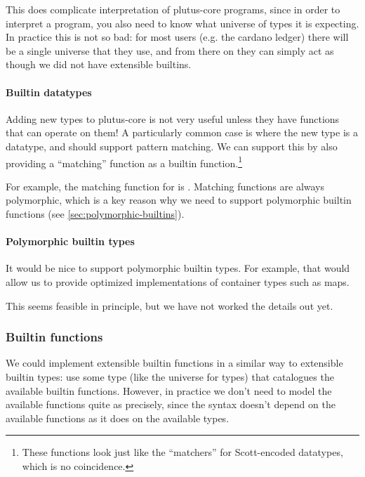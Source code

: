 This does complicate interpretation of \gls{plutus-core} programs, since in order to interpret a program, you also need to know what universe of types it is expecting.
In practice this is not so bad: for most users (e.g. the \gls{cardano} ledger) there will be a single universe that they use, and from there on they can simply act as though we did not have extensible builtins.

\paragraph{Builtin datatypes}

Adding new types to \gls{plutus-core} is not very useful unless they have functions that can operate on them!
A particularly common case is where the new type is a datatype, and should support pattern matching.
We can support this by also providing a ``matching'' function as a builtin function.\footnote{
  These functions look just like the ``matchers'' for Scott-encoded datatypes, which is no coincidence.
}

For example, the matching function for  is .
Matching functions are always polymorphic, which is a key reason why we need to support polymorphic builtin functions (see \cref{sec:polymorphic-builtins}).

\paragraph{Polymorphic builtin types}

It would be nice to support polymorphic builtin types.
For example, that would allow us to provide optimized implementations of container types such as maps.

This seems feasible in principle, but we have not worked the details out yet.

\subsubsection{Builtin functions}

We could implement extensible builtin functions in a similar way to extensible builtin types: use some type (like the universe for types) that catalogues the available builtin functions.
However, in practice we don't need to model the available functions quite as precisely, since the syntax doesn't depend on the available functions as it does on the available types.


